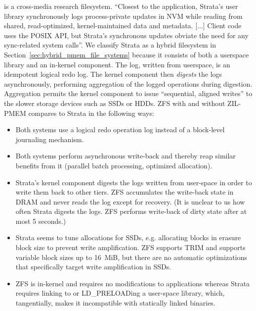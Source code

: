 \documentclass[12pt,a4paper,twoside]{book}
\begin{document}
 is a cross-media research filesystem.
“Closest to the application, Strata’s user library synchronously logs process-private updates in NVM while reading from shared, read-optimized, kernel-maintained data and metadata.
    [...]
Client code uses the POSIX API, but Strata’s synchronous updates obviate the need for any sync-related system calls”.
We classify Strata as a hybrid filesystem in Section~\ref{sec:hybrid_pmem_file_systems} because it consists of both a userspace library and an in-kernel component.
The log, written from userspace, is an idempotent logical redo log.
The kernel component then \textit{digests} the logs asynchronously, performing aggregation of the logged operations during digestion.
Aggregation permits the kernel component to issue “sequential, aligned writes” to the slower storage devices such as SSDs or HDDs.
ZFS with and without ZIL-PMEM compares to Strata in the following ways:
\begin{itemize}[noitemsep,beginpenalty=100000,midpenalty=100000]
    \item Both systems use a logical redo operation log instead of a block-level journaling mechanism.
    \item Both systems perform asynchronous write-back and thereby reap similar benefits from it (parallel batch processing, optimized allocation).
    \item Strata’s kernel component digests the logs written from user-space in order to write them back to other tiers.
          ZFS accumulates the write-back state in DRAM and never reads the log except for recovery.
          (It is unclear to us how often Strata digests the logs. ZFS performs write-back of dirty state after at most 5 seconds.)
    \item Strata seems to tune allocations for SSDs, e.g. allocating blocks in erasure block size to prevent write amplification.
          ZFS supports TRIM and supports variable block sizes up to \SI{16}{MiB}, but there are no automatic optimizations that specifically target write amplification in SSDs.
    \item ZFS is in-kernel and requires no modifications to applications whereas Strata requires linking to or LD\_PRELOADing a user-space library, which, tangentially, makes it incompatible with statically linked binaries.
\end{itemize}
\end{document}
